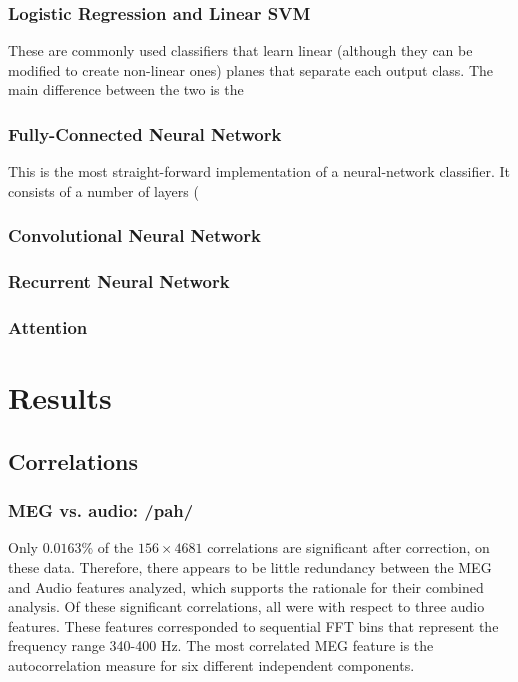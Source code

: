\documentclass[utf8]{frontiersSCNS} %
\begin{document}
\subsubsection{Logistic Regression and Linear SVM}

These are commonly used classifiers that learn linear (although they can be modified to create non-linear ones) planes that separate each output class. The main difference between the two is the  

\subsubsection{Fully-Connected Neural Network}

This is the most straight-forward implementation of a neural-network classifier. It consists of a number of layers (

\subsubsection{Convolutional Neural Network}

\subsubsection{Recurrent Neural Network}

\subsubsection{Attention}

\section{Results}

\subsection{Correlations}

\subsubsection{MEG vs. audio: /pah/}

Only $0.0163$\% of the $156 \times 4681$ correlations are significant after correction, on these data. Therefore, there appears to be little redundancy between the MEG and Audio features analyzed, which supports the rationale for their combined analysis. Of these significant correlations, all were with respect to three audio features. These features corresponded to sequential FFT bins that represent the frequency range 340-400 Hz. The most correlated MEG feature is the autocorrelation measure for six different independent components.
\end{document}
